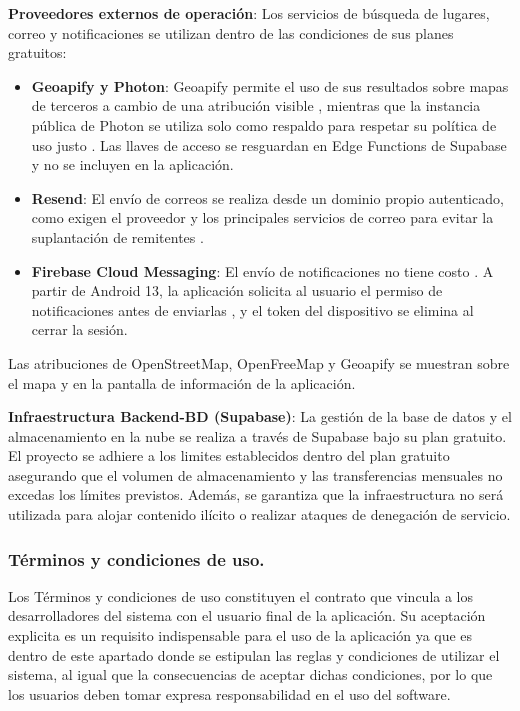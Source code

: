 \textbf{Proveedores externos de operación}: Los servicios de búsqueda de lugares, correo y notificaciones se utilizan dentro de las condiciones de sus planes gratuitos:

\begin{itemize}
    \item\textbf{Geoapify y Photon}: Geoapify permite el uso de sus resultados sobre mapas de terceros a cambio de una atribución visible \cite{geoapify_terminos}, mientras que la instancia pública de Photon se utiliza solo como respaldo para respetar su política de uso justo \cite{photon}. Las llaves de acceso se resguardan en Edge Functions de Supabase y no se incluyen en la aplicación.
    \item\textbf{Resend}: El envío de correos se realiza desde un dominio propio autenticado, como exigen el proveedor y los principales servicios de correo para evitar la suplantación de remitentes \cite{resend_supabase,brevo_dominio}.
    \item\textbf{Firebase Cloud Messaging}: El envío de notificaciones no tiene costo \cite{firebase_pricing}. A partir de Android 13, la aplicación solicita al usuario el permiso de notificaciones antes de enviarlas \cite{firebase_messaging}, y el token del dispositivo se elimina al cerrar la sesión.
\end{itemize}

Las atribuciones de OpenStreetMap, OpenFreeMap y Geoapify se muestran sobre el mapa y en la pantalla de información de la aplicación.

\textbf{Infraestructura Backend-BD (Supabase)}: La gestión de la base de datos y el almacenamiento en la nube se realiza a través de Supabase bajo su plan gratuito. El proyecto se adhiere a los limites establecidos dentro del plan gratuito asegurando que el volumen de almacenamiento y las transferencias mensuales no excedas los límites previstos. Además, se garantiza que la infraestructura no será utilizada para alojar contenido ilícito o realizar ataques de denegación de servicio.   


\subsubsection{Términos y condiciones de uso. }
Los Términos y condiciones de uso constituyen el contrato que vincula a los desarrolladores del sistema con el usuario final de la aplicación. Su aceptación explicita es un requisito indispensable para el uso de la aplicación ya que es dentro de este apartado donde se estipulan las reglas y condiciones de utilizar el sistema, al igual que la consecuencias de aceptar dichas condiciones, por lo que los usuarios deben tomar expresa responsabilidad en el uso del software.  

